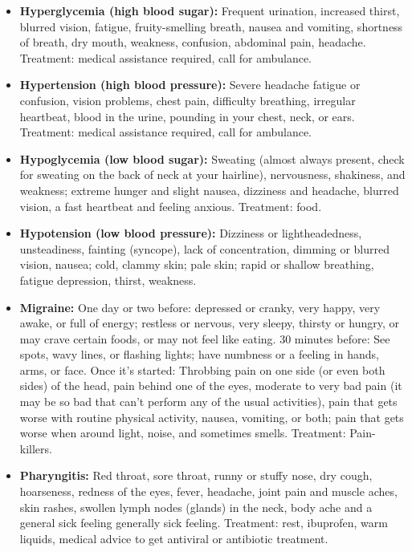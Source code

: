 \begin{itemize}
\item \textbf{Hyperglycemia (high blood sugar):} Frequent urination, increased thirst,
blurred vision, fatigue, fruity-smelling breath, nausea and vomiting, shortness of breath, dry mouth, weakness, confusion, abdominal pain, headache. Treatment: medical assistance required, call for ambulance.

\item \textbf{Hypertension (high blood pressure):} Severe headache fatigue or confusion, vision problems, chest pain, difficulty breathing, irregular heartbeat, blood in the urine, pounding in your chest, neck, or ears. Treatment: medical assistance required, call for ambulance.

\item \textbf{Hypoglycemia (low blood sugar):} Sweating (almost always present, check for sweating on the back of neck at your hairline), nervousness, shakiness, and weakness; extreme hunger and slight nausea, dizziness and headache, blurred vision, a fast heartbeat and feeling anxious. Treatment: food.

\item \textbf{Hypotension (low blood pressure):} Dizziness or lightheadedness, unsteadiness, fainting (syncope), lack of concentration, dimming or blurred vision, nausea; cold, clammy skin; pale skin; rapid or shallow breathing, fatigue depression, thirst, weakness.

\item \textbf{Migraine:} One day or two before: depressed or cranky, very happy, very awake, or full of energy; restless or nervous, very sleepy, thirsty or hungry, or may crave certain foods, or may not feel like eating. 30 minutes before: See spots, wavy lines, or flashing lights; have numbness or a  feeling in hands, arms, or face. Once it's started: Throbbing pain on one side (or even both sides) of the head, pain behind one of the eyes, moderate to very bad pain (it may be so bad that can't perform any of the usual activities), pain that gets worse with routine physical activity, nausea, vomiting, or both; pain that gets worse when around light, noise, and sometimes smells. Treatment: Pain-killers.

\item \textbf{Pharyngitis: } Red throat, sore throat, runny or stuffy nose, dry cough, hoarseness, redness of the eyes, fever, headache, joint pain and muscle aches, skin rashes, swollen lymph nodes (glands) in the neck, body ache and a general sick feeling generally sick feeling. Treatment: rest, ibuprofen, warm liquids, medical advice to get antiviral or antibiotic treatment.


\end{itemize}
